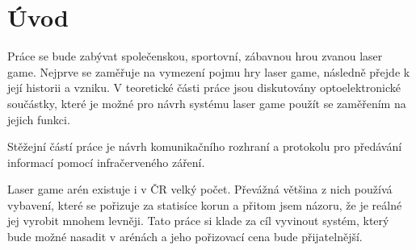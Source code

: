 \chapter*{Úvod}
{}


Práce se bude zabývat společenskou, sportovní, zábavnou hrou zvanou laser game. Nejprve se zaměřuje na vymezení pojmu hry laser game, následně přejde k její historii a vzniku. V teoretické části práce jsou diskutovány optoelektronické součástky, které je možné pro návrh systému laser game použít se zaměřením na jejich funkci.

Stěžejní částí práce je návrh komunikačního rozhraní a protokolu pro předávání informací pomocí infračerveného záření.

Laser game arén existuje i v ČR velký počet. Převážná většina z nich používá vybavení, které se pořizuje za statisíce korun a přitom jsem názoru, že je reálné jej vyrobit mnohem levněji. Tato práce si klade za cíl vyvinout systém, který bude možné nasadit v arénách a jeho pořizovací cena bude přijatelnější.
